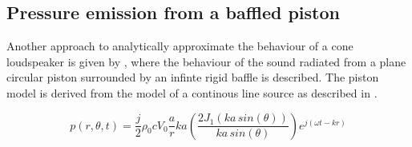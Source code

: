 \subsection{Pressure emission from a baffled piston}\label{ssec:piston}
Another  approach to analytically approximate the behaviour of a cone loudspeaker is given by \citep[p. 179 ff.]{Kinsler2000}, where the behaviour of the sound radiated from a plane circular piston surrounded by an infinte rigid baffle is described. The piston model is derived from the model of a continous line source as described in \citep[p. 176 f.]{Kinsler2000}.



\begin{equation}\label{eq:piston_source}
p(r,\theta ,t)=\frac{j}{2} \rho_{0}c  V_{0}\frac{a}{r}ka \left ( \frac{2J_1(ka\, sin(\theta ))}{ka\, sin(\theta )} \right )e^{j(\omega t-kr)}
\end{equation}
\startexplain
\stopexplain

